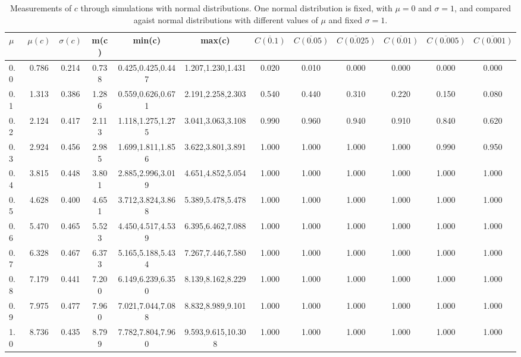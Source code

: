 \begin{table*}[h!]
\begin{center}
\begin{tabular}{| l | c | c | c | c | c | c | c | c | c | c | c |}\hline
$\mu$ & $\mu(c)$ & $\sigma(c)$ & m(c) & min(c) & max(c) & $\overline{C(0.1)}$ & $\overline{C(0.05)}$ & $\overline{C(0.025)}$ & $\overline{C(0.01)}$ & $\overline{C(0.005)}$ & $\overline{C(0.001)}$ \\\hline
0.0 & 0.786 & 0.214 & 0.738 & 0.425,0.425,0.447 & 1.207,1.230,1.431  & 0.020  & 0.010  & 0.000  & 0.000  & 0.000  & 0.000 \\\hline
0.1 & 1.313 & 0.386 & 1.286 & 0.559,0.626,0.671 & 2.191,2.258,2.303  & 0.540  & 0.440  & 0.310  & 0.220  & 0.150  & 0.080 \\\hline
0.2 & 2.124 & 0.417 & 2.113 & 1.118,1.275,1.275 & 3.041,3.063,3.108  & 0.990  & 0.960  & 0.940  & 0.910  & 0.840  & 0.620 \\\hline
0.3 & 2.924 & 0.456 & 2.985 & 1.699,1.811,1.856 & 3.622,3.801,3.891  & 1.000  & 1.000  & 1.000  & 1.000  & 0.990  & 0.950 \\\hline
0.4 & 3.815 & 0.448 & 3.801 & 2.885,2.996,3.019 & 4.651,4.852,5.054  & 1.000  & 1.000  & 1.000  & 1.000  & 1.000  & 1.000 \\\hline
0.5 & 4.628 & 0.400 & 4.651 & 3.712,3.824,3.868 & 5.389,5.478,5.478  & 1.000  & 1.000  & 1.000  & 1.000  & 1.000  & 1.000 \\\hline
0.6 & 5.470 & 0.465 & 5.523 & 4.450,4.517,4.539 & 6.395,6.462,7.088  & 1.000  & 1.000  & 1.000  & 1.000  & 1.000  & 1.000 \\\hline
0.7 & 6.328 & 0.467 & 6.373 & 5.165,5.188,5.434 & 7.267,7.446,7.580  & 1.000  & 1.000  & 1.000  & 1.000  & 1.000  & 1.000 \\\hline
0.8 & 7.179 & 0.441 & 7.200 & 6.149,6.239,6.350 & 8.139,8.162,8.229  & 1.000  & 1.000  & 1.000  & 1.000  & 1.000  & 1.000 \\\hline
0.9 & 7.975 & 0.477 & 7.960 & 7.021,7.044,7.088 & 8.832,8.989,9.101  & 1.000  & 1.000  & 1.000  & 1.000  & 1.000  & 1.000 \\\hline
1.0 & 8.736 & 0.435 & 8.799 & 7.782,7.804,7.960 & 9.593,9.615,10.308  & 1.000  & 1.000  & 1.000  & 1.000  & 1.000  & 1.000 \\\hline
\end{tabular}
\caption{Measurements of $c$ through simulations
        with normal distributions.
        One normal distribution is fixed, with $\mu=0$ and $\sigma=1$,
        and compared agaist normal distributions with different values of $\mu$ and fixed $\sigma=1$.}
\end{center}
\end{table*}